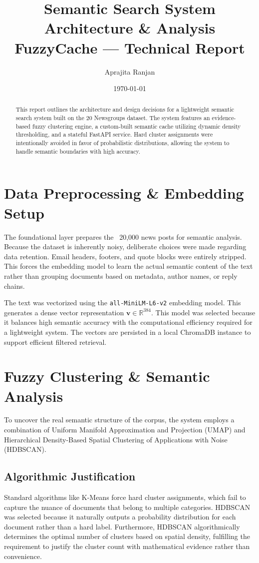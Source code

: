 \documentclass[11pt,a4paper]{article}
\title{\textbf{Semantic Search System Architecture \& Analysis}\\
\large FuzzyCache --- Technical Report}
\author{Aprajita Ranjan}
\date{\today}
\begin{document}
\maketitle

\begin{abstract}
This report outlines the architecture and design decisions for a lightweight semantic search system built on the 20 Newsgroups dataset. The system features an evidence-based fuzzy clustering engine, a custom-built semantic cache utilizing dynamic density thresholding, and a stateful FastAPI service. Hard cluster assignments were intentionally avoided in favor of probabilistic distributions, allowing the system to handle semantic boundaries with high accuracy.
\end{abstract}

\section{Data Preprocessing \& Embedding Setup}
The foundational layer prepares the ~20,000 news posts for semantic analysis. Because the dataset is inherently noisy, deliberate choices were made regarding data retention. Email headers, footers, and quote blocks were entirely stripped. This forces the embedding model to learn the actual semantic content of the text rather than grouping documents based on metadata, author names, or reply chains.

The text was vectorized using the \texttt{all-MiniLM-L6-v2} embedding model. This generates a dense vector representation $\mathbf{v} \in \mathbb{R}^{384}$. This model was selected because it balances high semantic accuracy with the computational efficiency required for a lightweight system. The vectors are persisted in a local ChromaDB instance to support efficient filtered retrieval.

\section{Fuzzy Clustering \& Semantic Analysis}
To uncover the real semantic structure of the corpus, the system employs a combination of Uniform Manifold Approximation and Projection (UMAP) and Hierarchical Density-Based Spatial Clustering of Applications with Noise (HDBSCAN). 

\subsection{Algorithmic Justification}
Standard algorithms like K-Means force hard cluster assignments, which fail to capture the nuance of documents that belong to multiple categories. HDBSCAN was selected because it naturally outputs a probability distribution for each document rather than a hard label. Furthermore, HDBSCAN algorithmically determines the optimal number of clusters based on spatial density, fulfilling the requirement to justify the cluster count with mathematical evidence rather than convenience.
\end{document}
